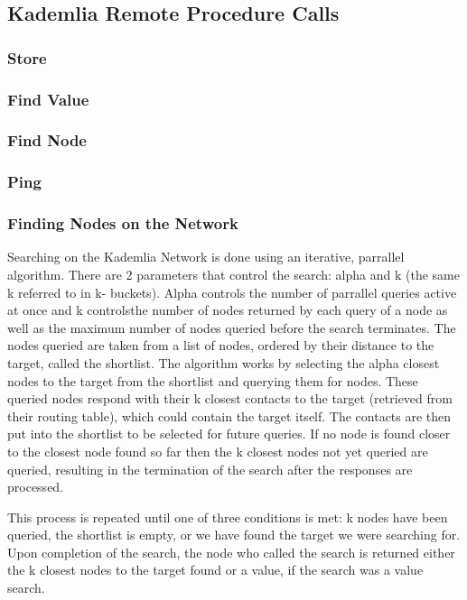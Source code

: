 \documentclass[12pt]{report}
\begin{document}
        \subsection{Kademlia Remote Procedure Calls}
            \subsubsection{Store}
            \subsubsection{Find Value}
            \subsubsection{Find Node}
            \subsubsection{Ping}
            \subsubsection{Finding Nodes on the Network}
	    	Searching on the Kademlia Network is done using an iterative, parrallel
		algorithm. There are 2 parameters that control the search: alpha and k 
		(the same k referred to in k- buckets). Alpha controls the number of 
		parrallel queries active at once and k controlsthe number of nodes 
		returned by each query of a node as well as the maximum number of nodes 
		queried before the search terminates. The nodes queried are taken from 
		a list of nodes, ordered by their distance to the target, called the 
		shortlist. The algorithm works by selecting the alpha closest nodes to 
		the target from the shortlist and querying them for nodes. These 
		queried nodes respond with their k closest contacts to the target 
		(retrieved from their routing table), which could contain the target 
		itself. The contacts are then put into the shortlist to be selected 
		for future queries. If no node is found closer to the closest node found 
		so far then the k closest nodes not yet queried are queried, resulting 
		in the termination of the search after the responses are processed.
		
		This process is repeated until one of three conditions is met: k nodes
		have been queried, the shortlist is empty, or we have found the target 
		we were searching for. Upon completion of the search, the node who 
		called the search is returned either the k closest nodes to the target 
		found or a value, if the search was a value search.
		
\end{document}
